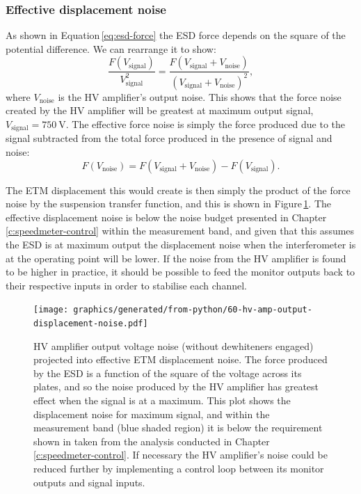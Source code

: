 \subsubsection{Effective displacement noise}
As shown in Equation\,\ref{eq:esd-force} the \gls{ESD} force depends on the square of the potential difference. We can rearrange it to show:
\begin{equation}
  \frac{F \left( V_{\text{signal}} \right)}{V_{\text{signal}}^2} = \frac{F \left( V_{\text{signal}} + V_{\text{noise}} \right)}{\left( V_{\text{signal}} + V_{\text{noise}} \right)^2},
\end{equation}
where $V_{\text{noise}}$ is the \gls{HV} amplifier's output noise. This shows that the force noise created by the \gls{HV} amplifier will be greatest at maximum output signal, $V_{\text{signal}} = \SI{750}{\volt}$. The effective force noise is simply the force produced due to the signal subtracted from the total force produced in the presence of signal and noise:
\begin{equation}
  F \left( V_{\text{noise}} \right) = F \left( V_{\text{signal}} + V_{\text{noise}} \right) - F \left( V_{\text{signal}} \right).
\end{equation}

The \gls{ETM} displacement this would create is then simply the product of the force noise by the suspension transfer function, and this is shown in Figure\,\ref{fig:hv-amp-output-displacement-noise}. The effective displacement noise is below the noise budget presented in Chapter\,\ref{c:speedmeter-control} within the measurement band, and given that this assumes the \gls{ESD} is at maximum output the displacement noise when the interferometer is at the operating point will be lower. If the noise from the \gls{HV} amplifier is found to be higher in practice, it should be possible to feed the monitor outputs back to their respective inputs in order to stabilise each channel.

\begin{figure}
  \centering
  \texttt{[image: graphics/generated/from-python/60-hv-amp-output-displacement-noise.pdf]}
  \caption[High voltage amplifier output projected end test mass displacement noise]{\gls{HV} amplifier output voltage noise (without dewhiteners engaged) projected into effective \gls{ETM} displacement noise. The force produced by the \gls{ESD} is a function of the square of the voltage across its plates, and so the noise produced by the \gls{HV} amplifier has greatest effect when the signal is at a maximum. This plot shows the displacement noise for maximum signal, and within the measurement band (blue shaded region) it is below the requirement shown in  taken from the analysis conducted in Chapter\,\ref{c:speedmeter-control}. If necessary the \gls{HV} amplifier's noise could be reduced further by implementing a control loop between its monitor outputs and signal inputs.}
  \label{fig:hv-amp-output-displacement-noise}
\end{figure}

